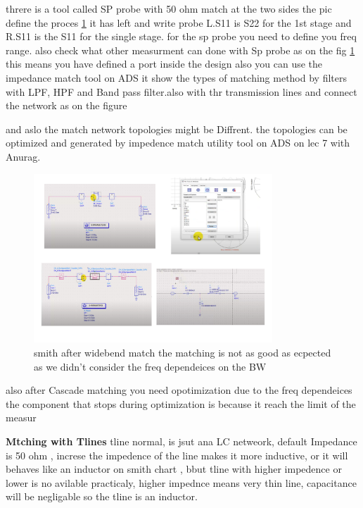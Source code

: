 \documentclass{article}
\begin{document}
\begin{itemize}
threre is a tool called SP probe with 50 ohm match at the two sides the pic define the proces \cref{Anurug rf6_4}
it has left and write probe L.S11 is S22 for the 1st stage and R.S11 is the S11 for the single stage. for the sp probe you need to define you freq range. also check what other measurment can done with Sp probe as on the fig \cref{Anurug rf6_4}
this means you have defined a port inside the design 
also you can use the impedance match tool on ADS it show the types of matching method by filters with LPF, HPF and Band pass filter.also with thr transmission lines 
and connect the network as on the  figure 

and aslo the match network topologies might be Diffrent. the topologies can be optimized and generated by impedence match utility tool on ADS on lec 7 with Anurag.

\begin{figure}[H]
    \centering
    \includegraphics[width=0.8\textwidth]{figures/Anurug rf6_4.pdf}
    \caption{smith after widebend match the matching is not as good as ecpected as we didn't consider the freq dependeices on the BW }
    \label{Anurug rf6_4}
\end{figure}
 
also after Cascade matching you need opotimization due to the freq dependeices 
the component that stops during optimization is because it reach the limit of the measur 





\textbf{Mtching with Tlines}
tline normal,  is jsut ana LC netweork, default Impedance is 50 ohm , increse the impedence of the line makes it more inductive, or it will behaves like an inductor on smith chart , bbut tline with higher impedence or lower is no avilable practicaly, higher impednce means very thin line, capacitance will be negligable so the tline is an inductor.



\end{itemize}
\end{document}
